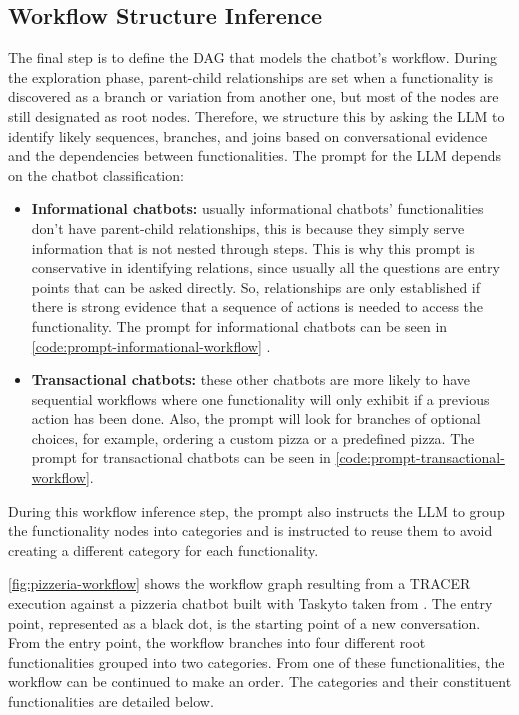 \subsection{Workflow Structure Inference}

The final step is to define the \ac{DAG}
that models the chatbot's workflow.
During the exploration phase,
parent-child relationships are set
when a functionality is discovered as a branch or variation from another one,
but most of the nodes are still designated as root nodes.
Therefore, we structure this by asking the \ac{LLM}
to identify likely sequences, branches, and joins
based on conversational evidence and the dependencies between functionalities.
The prompt for the LLM depends on the chatbot classification:

\begin{itemize}
  \item \textbf{Informational chatbots:}
    usually informational chatbots' functionalities
    don't have parent-child relationships,
    this is because they simply serve information that is not nested through steps.
    This is why this prompt is conservative in identifying relations,
    since usually all the questions are entry points
    that can be asked directly.
    So, relationships are only established
    if there is strong evidence that
    a sequence of actions is needed to access the functionality.
    The prompt for informational chatbots can be seen in
    \autoref{code:prompt-informational-workflow}
    .

  \item \textbf{Transactional chatbots:}
    these other chatbots are more likely to have sequential workflows
    where one functionality will only exhibit
    if a previous action has been done.
    Also, the prompt will look for branches of optional choices,
    for example, ordering a custom pizza or a predefined pizza.
    The prompt for transactional chatbots can be seen in \autoref{code:prompt-transactional-workflow}.
\end{itemize}

During this workflow inference step,
the prompt also instructs the \ac{LLM}
to group the functionality nodes into categories
and is instructed to reuse them
to avoid creating a different category for each functionality.

\autoref{fig:pizzeria-workflow}
shows the workflow graph resulting from a \ac{TRACER} execution
against a pizzeria chatbot built with Taskyto taken from
\autocite{sanchezcuadradoAutomatingDevelopmentTaskoriented2024}.
The entry point, represented as a black dot,
is the starting point of a new conversation.
From the entry point,
the workflow branches into
four different root functionalities
grouped into two categories.
From one of these functionalities,
the workflow can be continued to make an order.
The categories and their constituent functionalities
are detailed below.

